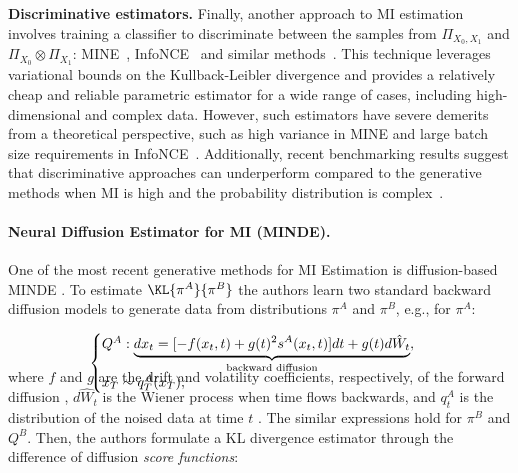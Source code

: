 \textbf{Discriminative estimators.}
Finally, another approach to MI estimation involves training a classifier to discriminate between the samples from $ \Pi_{X_0,X_1} $ and $ \Pi_{X_0} \otimes \Pi_{X_1}$:  MINE~\cite{belghazi2018mine}, InfoNCE~\cite{oord2019infoNCE} and similar methods~\cite{song2020understanding_limitations}.
This technique leverages variational bounds on the Kullback-Leibler divergence and provides a relatively cheap and reliable parametric estimator for a wide range of cases, including high-dimensional and complex data.
However, such estimators have severe demerits from a theoretical perspective, such as high variance in MINE and large batch size requirements in InfoNCE~\cite{song2020understanding_limitations}.
Additionally, recent benchmarking results suggest that discriminative approaches can underperform compared to the generative methods when MI is high and the probability distribution is complex~\cite{franzese2024minde,butakov2024normflows}.

\vspace{-3mm}
\paragraph{Neural Diffusion Estimator for MI (MINDE).} \label{sec:minde}

One of the most recent generative methods for MI Estimation is diffusion-based \cite{song2021sde} MINDE \cite{franzese2024minde}. To estimate $\KL{\pi^A}{\pi^B}$ the authors learn two standard backward diffusion models to generate data from distributions $\pi^A$ and $\pi^B$, e.g., for $\pi^A$:


\vspace{-4mm}
\begin{gather}
    \begin{cases}
    Q^A: \underbrace{dx_{t}=[-f(x_t, t) + g(t)^2 s^{A}(x_t, t)]dt + g(t)d\hat{W}_t}_{\text{backward diffusion}}, \\
    x_T \sim q^A_{T}(x_T), \label{eq:diffusion_minde}
    \end{cases}
    \vspace{-10mm}
\end{gather}
\vspace{-4mm}


where $f$ and $g$ are the drift and volatility coefficients, respectively, of the forward diffusion \cite{song2021sde}, $d\hat{W}_t$ is the Wiener process when time flows backwards, and $q^A_{t}$ is the distribution of the noised data at time $t$ \citep[, 3]{franzese2024minde}. The similar expressions hold for $\pi^B$ and $Q^B$. Then, the authors formulate a KL divergence estimator through the difference of diffusion \textit{score functions}:

